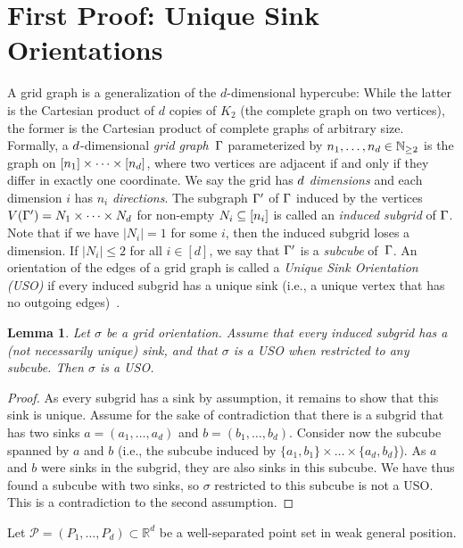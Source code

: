 \documentclass[11pt]{article}
\newtheorem{lemma}[theorem]{Lemma}
\newcommand{\R}{\mathbb{R}}
\newcommand{\abs}[1]{\left\lvert #1 \right\rvert\xspace}
\newcommand{\Naturals}{\mathbb{N}\xspace}
\newcommand{\f}[1]{\relax\ifmmode#1\else{$#1$}\fi}
\newcommand{\dimensionA}{\f{d}\xspace}
\newcommand{\dimension}{\f{d}\xspace}
\newcommand{\Grid}{\f{\Gamma}\xspace}
\newcommand{\partitionLength}{\f{n}\xspace}
\begin{document}
\section{First Proof: Unique Sink Orientations}
\label{sec:uso_proof}
%
A grid graph is a generalization of the $d$-dimensional hypercube: 
While the latter is the Cartesian product of $d$ copies of $K_2$ (the complete graph on two vertices), the former is the Cartesian product of complete graphs of arbitrary size.
Formally, a $\dimensionA$-dimensional \emph{grid graph}~$\Grid$ parameterized by $\partitionLength_1, \dots, \partitionLength_\dimensionA \in \Naturals_{\geq 2}$ is the graph on $[\partitionLength_1] \times \dots \times [\partitionLength_\dimensionA]$, where two vertices are adjacent if and only if they differ in exactly one coordinate.
We say the grid has $\dimensionA$ \emph{dimensions} and each dimension $i$ has $n_i$ \emph{directions}.
%
The subgraph $\Grid'$ of $\Grid$ induced by the vertices $V(\Grid') = N_1 \times \dots \times N_\dimension$ for non-empty $N_i \subseteq [\partitionLength_i]$ 
is called an \emph{induced subgrid} of $\Grid$.
Note that if we have $\abs{N_i}=1$ for some $i$, then the induced subgrid loses a dimension.
If $\abs{N_i} \leq 2$ for all $i \in [d]$, we say that $\Grid'$ is a \emph{subcube} of~$\Grid$.
An orientation of the edges of a grid graph is called a \emph{Unique Sink Orientation (USO)} if every induced subgrid has a unique sink (i.e., a unique vertex that has no outgoing edges)~\cite{gaertner2008grids}.
%
%
\begin{lemma}\label{lem:GridUSO}
Let $\sigma$ be a grid orientation. Assume that every induced subgrid has a (not necessarily unique) sink, and that $\sigma$ is a USO when restricted to any subcube. Then $\sigma$ is a USO.
\end{lemma}
%
\begin{proof}
As every subgrid has a sink by assumption, it remains to show that this sink is unique. Assume for the sake of contradiction that there is a subgrid that has two sinks $a=(a_1,\ldots,a_d)$ and $b=(b_1,\ldots,b_d)$. 
%
Consider now the subcube spanned by $a$ and $b$ (i.e., the subcube induced by $\{a_1, b_1\} \times \dots \times \{a_d, b_d\}$). As $a$ and $b$ were sinks in the subgrid, they are also sinks in this subcube. We have thus found a subcube with two sinks, so $\sigma$ restricted to this subcube is not a USO. This is a contradiction to the second assumption.
\end{proof}
%
Let $\mathcal{P} = (P_1, \dots, P_d) \subset \R^d$ be a well-separated point set in weak general position.
\end{document}
